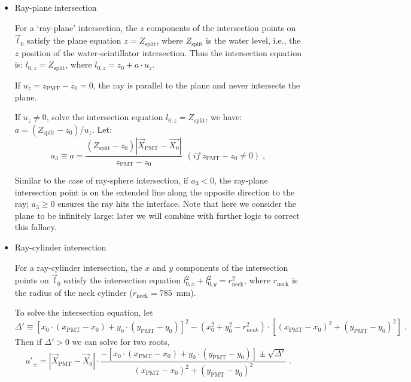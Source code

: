 \begin{itemize}
\item Ray-plane intersection

For a `ray-plane' intersection, the $z$ components of the intersection points on $\vec{l}_0$ satisfy the plane equation $z=Z_\mathrm{split}$, where $Z_\mathrm{split}$ is the water level, i.e., the $z$ position of the water-scintillator intersection. Thus the intersection equation is:
$l_{0,z}=Z_\mathrm{split}$, where $l_{0,z}=z_0+a\cdot u_z$.

If $u_z=z_\mathrm{PMT}-z_0=0$, the ray is parallel to the plane and never intersects the plane.

If $u_z\neq 0$, solve the intersection equation $l_{0,z}=Z_\mathrm{split}$, we have: $a=(Z_\mathrm{split}-z_0)/u_z$.
Let: 
\begin{equation}
a_3 \equiv a = \frac{(Z_\mathrm{split}-z_0)|\vec{X}_{\mathrm{PMT}}-\vec{X_0}|}{z_\mathrm{PMT}-z_0}~~(if ~z_\mathrm{PMT}-z_0\neq 0)\;,
\end{equation}

Similar to the case of ray-sphere intersection, if $a_3<0$, the ray-plane intersection point is on the extended line along the opposite direction to the ray; $a_3 \geq 0$ ensures the ray hits the interface. Note that here we consider the plane to be infinitely large: later we will combine with further logic to correct this fallacy. 

\item Ray-cylinder intersection

For a ray-cylinder intersection, the $x$ and $y$ components of the intersection points on $\vec l_0$ satisfy the intersection equation $l^2_{0,x}+l^2_{0,y} = r^2_\mathrm{neck}$, where $r_\mathrm{neck}$ is the radius of the neck cylinder ($r_\mathrm{neck}=785$~mm).

To solve the intersection equation, let 
\begin{equation*}
\Delta'\equiv [x_0\cdot (x_\mathrm{PMT}-x_0)+y_0\cdot(y_\mathrm{PMT}-y_0)]^2 - ( x_0^2+y_0^2-r^2_{neck})\cdot [(x_\mathrm{PMT}-x_0)^2+(y_\mathrm{PMT}-y_0)^2] \; . 
\end{equation*}
Then if $\Delta'>0$ we can solve for two roots, 
\begin{equation}\label{eq:ray-cylinder}
a'_{\pm} = |\vec{X}_\mathrm{PMT}-\vec{X}_0|\cdot\frac{-[x_0\cdot (x_\mathrm{PMT}-x_0)+y_0\cdot(y_\mathrm{PMT}-y_0)] \pm \sqrt{\Delta'} }{(x_\mathrm{PMT}-x_0)^2+(y_\mathrm{PMT}-y_0)^2} \; .
\end{equation}


\end{itemize}
